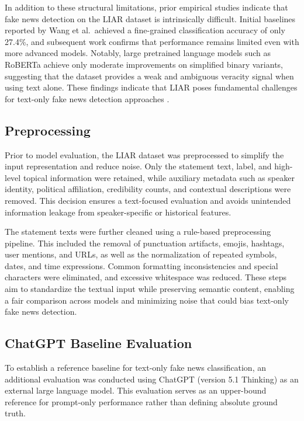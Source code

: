 In addition to these structural limitations, prior empirical studies indicate that fake news detection on the LIAR dataset is intrinsically difficult. Initial baselines reported by Wang et al.\ achieved a fine-grained classification accuracy of only 27.4\%, and subsequent work confirms that performance remains limited even with more advanced models. Notably, large pretrained language models such as RoBERTa achieve only moderate improvements on simplified binary variants, suggesting that the dataset provides a weak and ambiguous veracity signal when using text alone. These findings indicate that LIAR poses fundamental challenges for text-only fake news detection approaches \cite{hasan2025generalizationgapspoliticalfake}.

\subsection{Preprocessing}
\label{sec:preprocessing}
Prior to model evaluation, the LIAR dataset was preprocessed to simplify the input representation and reduce noise. Only the statement text, label, and high-level topical information were retained, while auxiliary metadata such as speaker identity, political affiliation, credibility counts, and contextual descriptions were removed. This decision ensures a text-focused evaluation and avoids unintended information leakage from speaker-specific or historical features.

The statement texts were further cleaned using a rule-based preprocessing pipeline. This included the removal of punctuation artifacts, emojis, hashtags, user mentions, and URLs, as well as the normalization of repeated symbols, dates, and time expressions. Common formatting inconsistencies and special characters were eliminated, and excessive whitespace was reduced. These steps aim to standardize the textual input while preserving semantic content, enabling a fair comparison across models and minimizing noise that could bias text-only fake news detection.

\subsection{ChatGPT Baseline Evaluation}
\label{sec:gold_standard_eval}

To establish a reference baseline for text-only fake news classification, an additional evaluation was conducted using ChatGPT (version 5.1 Thinking) as an external large language model. This evaluation serves as an upper-bound reference for prompt-only performance rather than defining absolute ground truth.


